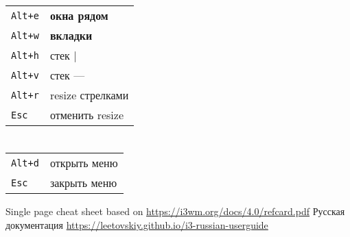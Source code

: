 \begin{multicols}{3}
\section{}
\begin{tabular}{@{}ll@{}}
    \verb!Alt+e! & \textbf{окна рядом} \\
    \verb!Alt+w! & \textbf{вкладки} \\
    \verb!Alt+h! & стек | \\
    \verb!Alt+v! & стек --- \\
    \verb!Alt+r! & resize стрелками \\
	\verb!Esc! & отменить resize \\
\end{tabular}

\section{}
\begin{tabular}{@{}ll@{}}
	\verb!Alt+d! & открыть меню \\
	\verb!Esc! & закрыть меню \\
\end{tabular}

\vspace{.5in}
Single page cheat sheet based on \url{https://i3wm.org/docs/4.0/refcard.pdf}
Русская документация \url{https://leetovskiy.github.io/i3-russian-userguide}

\end{multicols}

